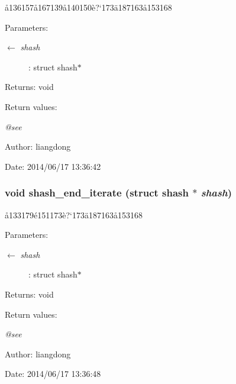 \aa{}136157\aa{}167139\aa{}140150\`{e}?`173\"{a}187163\aa{}153168 

\begin{Desc}
\item[Parameters:]
\begin{description}
\item[\mbox{$\leftarrow$} {\em shash}]: struct shash$\ast$ \end{description}
\end{Desc}
\begin{Desc}
\item[Returns:]void \end{Desc}
\begin{Desc}
\item[Return values:]
\begin{description}
\item[{\em @see}]\end{description}
\end{Desc}
\begin{Desc}
\item[Author:]liangdong \end{Desc}
\begin{Desc}
\item[Date:]2014/06/17 13:36:42 \end{Desc}
\subsubsection{\setlength{\rightskip}{0pt plus 5cm}void shash\_\-end\_\-iterate (struct shash $\ast$ {\em shash})}\label{shash_8h_a9}


\aa{}133179\'{e}151173\`{e}?`173\"{a}187163\aa{}153168 

\begin{Desc}
\item[Parameters:]
\begin{description}
\item[\mbox{$\leftarrow$} {\em shash}]: struct shash$\ast$ \end{description}
\end{Desc}
\begin{Desc}
\item[Returns:]void \end{Desc}
\begin{Desc}
\item[Return values:]
\begin{description}
\item[{\em @see}]\end{description}
\end{Desc}
\begin{Desc}
\item[Author:]liangdong \end{Desc}
\begin{Desc}
\item[Date:]2014/06/17 13:36:48 \end{Desc}
